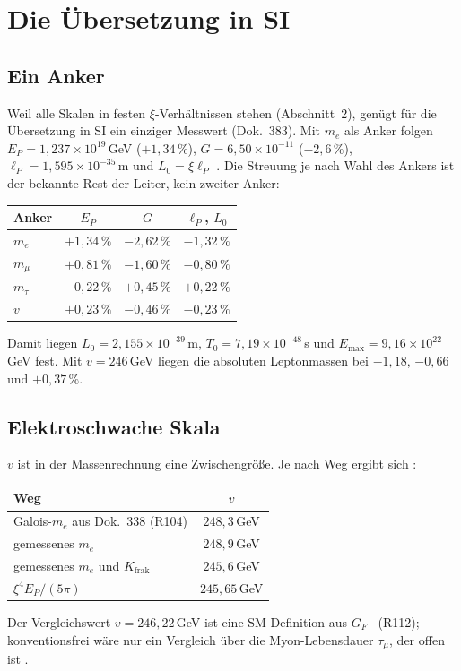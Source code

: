 \section{Die Übersetzung in SI}

\subsection{Ein Anker}

Weil alle Skalen in festen $\xi$-Verhältnissen stehen (Abschnitt~2), genügt für die
Übersetzung in SI ein einziger Messwert (Dok.~383). Mit $m_e$ als Anker folgen
$E_P=1{,}237\times10^{19}$\,GeV ($+1{,}34\,\%$), $G=6{,}50\times10^{-11}$ ($-2{,}6\,\%$),
$\ell_P=1{,}595\times10^{-35}$\,m und $L_0=\xi\ell_P$ \KM. Die Streuung je nach Wahl des Ankers
ist der bekannte Rest der Leiter, kein zweiter Anker:
\begin{center}
\small
\begin{tabular}{@{}lccc@{}}
\toprule
\textbf{Anker} & $E_P$ & $G$ & $\ell_P$, $L_0$ \\
\midrule
$m_e$ & $+1{,}34\,\%$ & $-2{,}62\,\%$ & $-1{,}32\,\%$ \\
$m_\mu$ & $+0{,}81\,\%$ & $-1{,}60\,\%$ & $-0{,}80\,\%$ \\
$m_\tau$ & $-0{,}22\,\%$ & $+0{,}45\,\%$ & $+0{,}22\,\%$ \\
$v$ & $+0{,}23\,\%$ & $-0{,}46\,\%$ & $-0{,}23\,\%$ \\
\bottomrule
\end{tabular}
\end{center}
\noindent Damit liegen $L_0=2{,}155\times10^{-39}$\,m, $T_0=7{,}19\times10^{-48}$\,s und
$E_{\max}=9{,}16\times10^{22}$\,GeV fest. Mit $v=246$\,GeV liegen die absoluten Leptonmassen bei
$-1{,}18$, $-0{,}66$ und $+0{,}37\,\%$.

\subsection{Elektroschwache Skala}

$v$ ist in der Massenrechnung eine Zwischengröße. Je nach Weg ergibt sich \KM:
\begin{center}
\small
\begin{tabular}{@{}lc@{}}
\toprule
\textbf{Weg} & $v$ \\
\midrule
Galois-$m_e$ aus Dok.~338 (R104) & $248{,}3$\,GeV \\
gemessenes $m_e$ & $248{,}9$\,GeV \\
gemessenes $m_e$ und $K_{\text{frak}}$ & $245{,}6$\,GeV \\
$\xi^4E_P/(5\pi)$ & $245{,}65$\,GeV \\
\bottomrule
\end{tabular}
\end{center}
Der Vergleichswert
$v=246{,}22$\,GeV ist eine SM-Definition aus $G_F$ \QM\ (R112); konventionsfrei wäre nur ein
Vergleich über die Myon-Lebensdauer $\tau_\mu$, der offen ist \SM.

